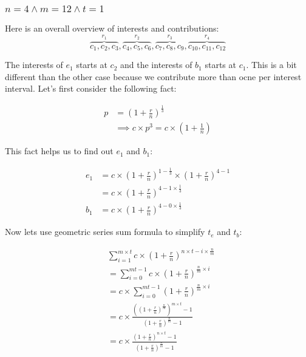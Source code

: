 \documentclass{book}
\begin{document}
	\subsubsection{$n = 4 \land m = 12 \land t = 1$}
	Here is an overall overview of interests and contributions:
	\begin{equation*}
		\overbrace{c_1, c_2, c_3}^{r_1}, \overbrace{c_4, c_5, c_6}^{r_2}, \overbrace{c_7, c_8, c_9}^{r_3}, \overbrace{c_{10}, c_{11}, c_{12}}^{r_4}
	\end{equation*}
	
	The interests of $e_1$ starts at $c_2$ and the interests of $b_1$ starts at $c_1$. This is a bit different than the other case because we contribute more than ocne per interest interval. Let's first consider the following fact:
	
	\begin{equation*}
		\begin{split}
		p &= (1 + \frac{r}{n})^{\frac{1}{3}} \\
		&\implies c \times p^3 = c \times (1 + \frac{1}{n})
		\end{split}		
	\end{equation*}
	
	This fact helps us to find out $e_1$ and $b_1$:
	
	\begin{equation*}
		\begin{split}
			e_1 &= c \times (1 + \frac{r}{n})^{1 - \frac{1}{3}} \times (1 + \frac{r}{n})^{4 - 1} \\
			&= c \times (1 + \frac{r}{n})^{4 - 1 \times \frac{1}{3}} \\
			b_1 &= c \times (1 + \frac{r}{n})^{4 - 0 \times \frac{1}{3}}
		\end{split}
	\end{equation*}
	
	Now lets use geometric series sum formula to simplify $t_e$ and $t_b$:
	
	\begin{equation*}
		\begin{split}
			&\sum_{i = 1}^{m \times t}{c \times (1 + \frac{r}{n})^{n \times t - i \times \frac{n}{m}}}  \\
			&= \sum_{i = 0}^{mt - 1}{c \times (1 + \frac{r}{n})^{\frac{n}{m} \times i}} \\
			&= c \times \sum_{i = 0}^{mt - 1}{(1 + \frac{r}{n})^{\frac{n}{m} \times i}} \\
			&= c \times \frac{((1 + \frac{r}{n})^{\frac{n}{m}})^{m \times t} - 1}{(1 + \frac{r}{n})^{\frac{n}{m}} - 1} \\
			&= c \times \frac{(1 + \frac{r}{n})^{n \times t} - 1}{(1 + \frac{r}{n})^{\frac{n}{m}} - 1}
		\end{split}
	\end{equation*}
	
\end{document}
